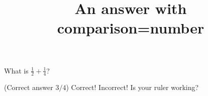 \documentclass[hidesidemenu]{webquiztex}
\title{An answer with comparison=number}
\begin{document}
  \begin{question}     %
      What is $\frac12+\frac14$?

      (Correct answer $3/4$)
     \whenRight Correct!
     \whenWrong Incorrect! Is your ruler working?
  \end{question}
\end{document}
